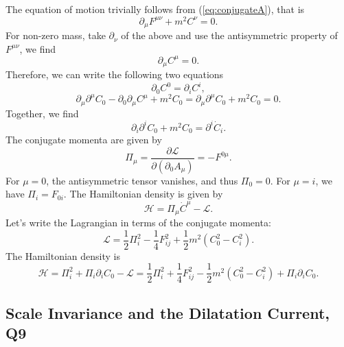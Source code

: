 \begin{solution}
    The equation of motion trivially follows from (\ref{eq:conjugateA}), that is
    \begin{equation}
        \partial_\mu F^{\mu\nu} + m ^2C^\nu =  0.
    \end{equation}
    For non-zero mass, take $\partial_\nu$ of the above and use the antisymmetric property of $F^{\mu\nu}$, we find
    \begin{equation}
        \partial_\mu C^\mu = 0.
    \end{equation}
    Therefore, we can write the following two equations
    \begin{equation}
        \partial_0 C^0 = \partial_i C^i,
    \end{equation}
    \begin{equation}
        \partial_\mu \partial^\mu C_0 - \partial_0 \partial_\mu C^\mu + m^2 C_0 = \partial_\mu \partial^\mu C_0  + m^2 C_0 = 0.
    \end{equation}
    Together, we find
    \begin{equation}
        \partial_i \partial^i C_0 + m^2 C_0 = \partial^i \dot{C}_i.
    \end{equation}
    The conjugate momenta are given by 
    \begin{equation}
        \Pi_\mu = \frac{\partial\mathcal{L}}{\partial(\partial_0 A_\mu)}= -F^{0\mu}.
    \end{equation}
    For $\mu = 0$, the antisymmetric tensor vanishes, and thus $\Pi_0 = 0$. For $\mu = i$, we have $\Pi_i = F_{0i}$. The Hamiltonian density is given by
    \begin{equation}
        \mathcal{H} = \Pi_\mu \dot{C}^\mu - \mathcal{L}.
    \end{equation}
    Let's write the Lagrangian in terms of the conjugate momenta:
    \begin{equation}
        \mathcal{L} = \frac{1}{2}\Pi_i^2 -\frac{1}{4}F_{ij}^2 + \frac{1}{2}m^2(C_0^2 - C_i^2).
    \end{equation}
    The Hamiltonian density is 
    \begin{equation}
        \mathcal{H} = \Pi_i^2 + \Pi_i\partial_iC_0 - \mathcal{L} =  \frac{1}{2}\Pi_i^2 +\frac{1}{4}F_{ij}^2 - \frac{1}{2}m^2(C_0^2 - C_i^2) + \Pi_i\partial_iC_0.
    \end{equation}
\end{solution}

\subsection{Scale Invariance and the Dilatation Current, Q9}

